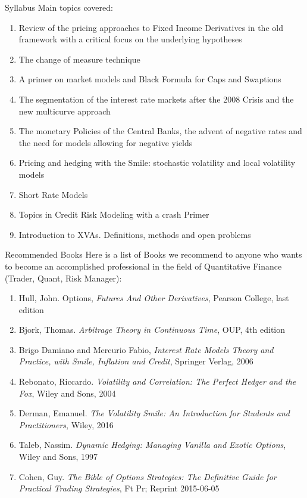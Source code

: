 \documentclass{beamer}
\begin{document}
\begin{frame}{Syllabus}
	Main topics covered:
	\begin{enumerate}	
	\item \textcolor{maincolor}{Review of the pricing approaches to Fixed Income Derivatives in the old framework with a critical focus on the underlying hypotheses}
	\item \textcolor{maincolor}{The change of measure technique}
	\item \textcolor{maincolor}{A primer on market models and Black Formula for Caps and Swaptions}
	\item The segmentation of the interest rate markets after the 2008 Crisis and the new multicurve approach
	\item The monetary Policies of the Central Banks, \textcolor{maincolor}{the advent of negative rates and the need for models allowing for negative yields}
	\item Pricing and hedging with the Smile: stochastic volatility and local volatility models
	\item Short Rate Models 
	\item Topics in Credit Risk Modeling with a crash Primer
	\item Introduction to XVAs. Definitions, methods and open problems
	\end{enumerate}
\end{frame}

\begin{frame}{Recommended Books}
	Here is a list of Books we recommend to anyone who wants to become an accomplished professional in the field of Quantitative Finance (Trader, Quant, Risk Manager):
	\begin{enumerate}
	\item Hull, John. Options, \textit{Futures And Other Derivatives}, Pearson College, last edition
	\item Bjork, Thomas. \textit{Arbitrage Theory in Continuous Time}, OUP, 4th edition
	\item Brigo Damiano and Mercurio Fabio, \textit{Interest Rate Models Theory and Practice, with Smile, Inflation and Credit}, Springer Verlag, 2006
	\item Rebonato, Riccardo. \textit{Volatility and Correlation: The Perfect Hedger and the Fox}, Wiley and Sons, 2004
	\item Derman, Emanuel. \textit{The Volatility Smile: An Introduction for Students and Practitioners}, Wiley, 2016
	\item Taleb, Nassim. \textit{Dynamic Hedging: Managing Vanilla and Exotic Options}, Wiley and Sons, 1997
	\item Cohen, Guy. \textit{The Bible of Options Strategies: The Definitive Guide for Practical Trading Strategies}, Ft Pr; Reprint 2015-06-05
\end{enumerate}
\end{frame}
\end{document}
